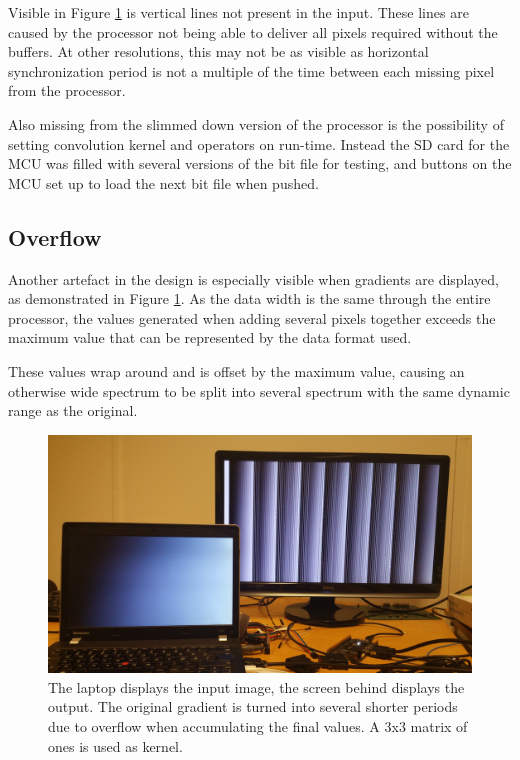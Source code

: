 Visible in Figure \ref{fig:Overflow} is vertical lines not present in the input.
These lines are caused by the processor not being able to deliver all pixels required without the buffers.
At other resolutions, this may not be as visible as horizontal synchronization period is not a multiple of the time between each missing pixel from the processor.

Also missing from the slimmed down version of the processor is the possibility of setting convolution kernel and operators on run-time.
Instead the SD card for the MCU was filled with several versions of the bit file for testing, and buttons on the MCU set up to load the next bit file when pushed.

\subsection{Overflow}
Another artefact in the design is especially visible when gradients are displayed, as demonstrated in Figure \ref{fig:Overflow}.
As the data width is the same through the entire processor, the values generated when adding several pixels together exceeds the maximum value that can be represented by the data format used.

These values wrap around and is offset by the maximum value, causing an otherwise wide spectrum to be split into several spectrum with the same dynamic range as the original.

\begin{figure}
    \centering
    \includegraphics[width=14cm]{img/gradient_test}
    \caption[The laptop displays the input image, the screen behind displays the output.]{
        The laptop displays the input image, the screen behind displays the output.
        The original gradient is turned into several shorter periods due to overflow when accumulating the final values.
        A 3x3 matrix of ones is used as kernel.
    }
    \label{fig:Overflow}

\end{figure}

